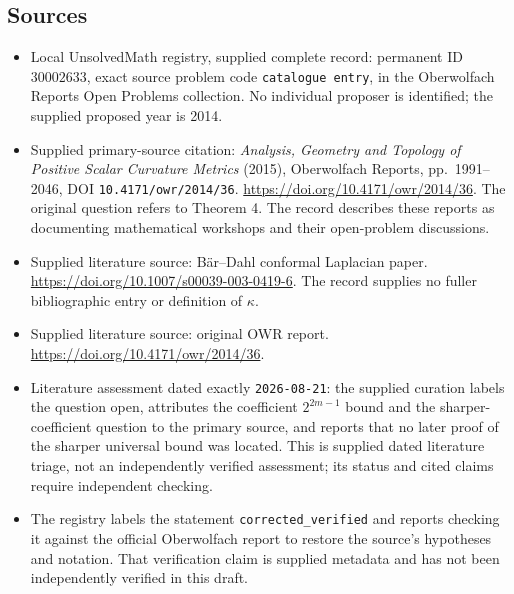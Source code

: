 \documentclass[11pt]{article}
\begin{document}
\subsection{Sources}
\begin{itemize}
\item Local UnsolvedMath registry, supplied complete record: permanent ID \(30002633\), exact source problem code \texttt{catalogue entry}, in the Oberwolfach Reports Open Problems collection. No individual proposer is identified; the supplied proposed year is 2014.
\item Supplied primary-source citation: \emph{Analysis, Geometry and Topology of Positive Scalar Curvature Metrics} (2015), Oberwolfach Reports, pp.\ 1991--2046, DOI \texttt{10.4171/owr/2014/36}. \url{https://doi.org/10.4171/owr/2014/36}. The original question refers to Theorem 4. The record describes these reports as documenting mathematical workshops and their open-problem discussions.
\item Supplied literature source: B\"ar--Dahl conformal Laplacian paper. \url{https://doi.org/10.1007/s00039-003-0419-6}. The record supplies no fuller bibliographic entry or definition of \(\kappa\).
\item Supplied literature source: original OWR report. \url{https://doi.org/10.4171/owr/2014/36}.
\item Literature assessment dated exactly \texttt{2026-08-21}: the supplied curation labels the question open, attributes the coefficient \(2^{2m-1}\) bound and the sharper-coefficient question to the primary source, and reports that no later proof of the sharper universal bound was located. This is supplied dated literature triage, not an independently verified assessment; its status and cited claims require independent checking.
\item The registry labels the statement \texttt{corrected\_verified} and reports checking it against the official Oberwolfach report to restore the source's hypotheses and notation. That verification claim is supplied metadata and has not been independently verified in this draft.
\end{itemize}
\end{document}
